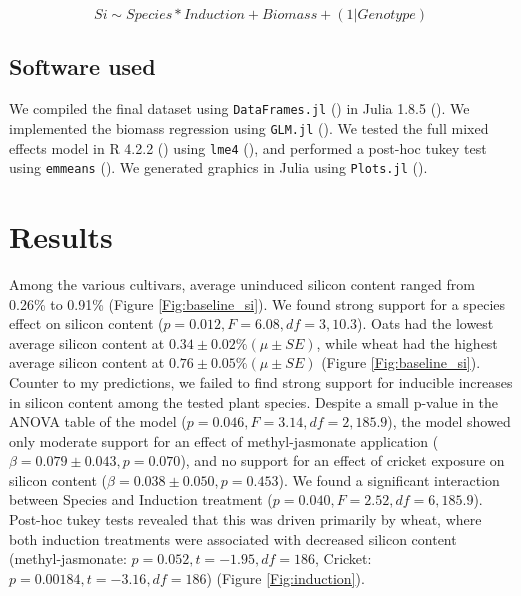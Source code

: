 \documentclass[12pt, letterpaper, ]{report}
\begin{document}
\[Si \sim Species * Induction + Biomass + (1|Genotype)\]



\subsection{Software used}

We compiled the final dataset using \verb|DataFrames.jl| (\cite{bogumil_kaminski_2023_7632427}) in Julia 1.8.5 (\cite{bezanson2017julia}). We implemented the biomass regression using \verb|GLM.jl| (\cite{douglas_bates_2023_7529836}). We tested the full mixed effects model in R 4.2.2 (\cite{r_core_team_2022}) using \verb|lme4| (\cite{lme4_bates_2015}), and performed a post-hoc tukey test using \verb|emmeans| (\cite{lenth_2023_emmeans}). We generated graphics in Julia using \verb|Plots.jl| (\cite{tom_breloff_2023_7736124}). 

\section{Results}
Among the various cultivars, average uninduced silicon content ranged from 0.26\% to 0.91\% (Figure \ref{Fig:baseline_si}). We found strong support for a species effect on silicon content ($p=0.012, F = 6.08, df=3,10.3$). Oats had the lowest average silicon content at $0.34 \pm 0.02\% (\mu \pm SE)$, while wheat had the highest average silicon content at $0.76 \pm 0.05\% (\mu \pm SE)$ (Figure \ref{Fig:baseline_si}). Counter to my predictions, we failed to find strong support for inducible increases in silicon content among the tested plant species. Despite a small p-value in the ANOVA table of the model ($p = 0.046, F = 3.14, df = 2,185.9$), the model showed only moderate support for an effect of methyl-jasmonate application ($\beta = 0.079 \pm 0.043, p = 0.070$), and no support for an effect of cricket exposure on silicon content ($\beta = 0.038 \pm 0.050, p = 0.453$). We found a significant interaction between Species and Induction treatment ($p = 0.040, F = 2.52, df = 6,185.9$). Post-hoc tukey tests revealed that this was driven primarily by wheat, where both induction treatments were associated with decreased silicon content (methyl-jasmonate: $p = 0.052, t = -1.95, df = 186$, Cricket: $p = 0.00184, t = -3.16, df = 186$) (Figure \ref{Fig:induction}).
\end{document}
